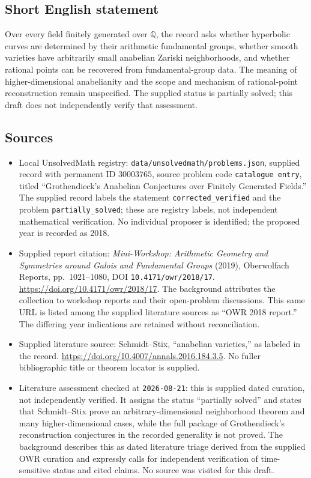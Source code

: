 \documentclass[11pt]{article}
\newcommand{\Q}{\mathbb{Q}}
\begin{document}
\subsection{Short English statement}
Over every field finitely generated over \(\Q\), the record asks whether hyperbolic curves are determined by their arithmetic fundamental groups, whether smooth varieties have arbitrarily small anabelian Zariski neighborhoods, and whether rational points can be recovered from fundamental-group data. The meaning of higher-dimensional anabelianity and the scope and mechanism of rational-point reconstruction remain unspecified. The supplied status is partially solved; this draft does not independently verify that assessment.
\subsection{Sources}
\begin{itemize}
\item Local UnsolvedMath registry: \texttt{data/unsolvedmath/problems.json}, supplied record with permanent ID \(30003765\), source problem code \texttt{catalogue entry}, titled ``Grothendieck's Anabelian Conjectures over Finitely Generated Fields.'' The supplied record labels the statement \texttt{corrected\_verified} and the problem \texttt{partially\_solved}; these are registry labels, not independent mathematical verification. No individual proposer is identified; the proposed year is recorded as 2018.
\item Supplied report citation: \emph{Mini-Workshop: Arithmetic Geometry and Symmetries around Galois and Fundamental Groups} (2019), Oberwolfach Reports, pp.~1021--1080, DOI \texttt{10.4171/owr/2018/17}. \url{https://doi.org/10.4171/owr/2018/17}. The background attributes the collection to workshop reports and their open-problem discussions. This same URL is listed among the supplied literature sources as ``OWR 2018 report.'' The differing year indications are retained without reconciliation.
\item Supplied literature source: Schmidt--Stix, ``anabelian varieties,'' as labeled in the record. \url{https://doi.org/10.4007/annals.2016.184.3.5}. No fuller bibliographic title or theorem locator is supplied.
\item Literature assessment checked at \texttt{2026-08-21}: this is supplied dated curation, not independently verified. It assigns the status ``partially solved'' and states that Schmidt--Stix prove an arbitrary-dimensional neighborhood theorem and many higher-dimensional cases, while the full package of Grothendieck's reconstruction conjectures in the recorded generality is not proved. The background describes this as dated literature triage derived from the supplied OWR curation and expressly calls for independent verification of time-sensitive status and cited claims. No source was visited for this draft.
\end{itemize}
\end{document}
